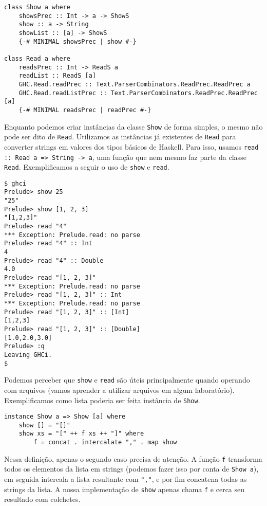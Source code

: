 \documentclass[a4paper]{article}
\begin{document}
\begin{verbatim}
class Show a where
	showsPrec :: Int -> a -> ShowS
	show :: a -> String
	showList :: [a] -> ShowS
	{-# MINIMAL showsPrec | show #-}

class Read a where
	readsPrec :: Int -> ReadS a
	readList :: ReadS [a]
	GHC.Read.readPrec :: Text.ParserCombinators.ReadPrec.ReadPrec a
	GHC.Read.readListPrec :: Text.ParserCombinators.ReadPrec.ReadPrec [a]
	{-# MINIMAL readsPrec | readPrec #-}
\end{verbatim}

Enquanto podemos criar instâncias da classe \texttt{Show} de forma simples, o mesmo não pode ser dito de \texttt{Read}.
Utilizamos as instâncias já existentes de \texttt{Read} para converter strings em valores dos tipos básicos de Haskell.
Para isso, usamos \texttt{read :: Read a => String -> a}, uma função que nem mesmo faz parte da classe \texttt{Read}.
Exemplificamos a seguir o uso de \texttt{show} e \texttt{read}.

\begin{verbatim}
$ ghci
Prelude> show 25
"25"
Prelude> show [1, 2, 3]
"[1,2,3]"
Prelude> read "4"
*** Exception: Prelude.read: no parse
Prelude> read "4" :: Int
4
Prelude> read "4" :: Double
4.0
Prelude> read "[1, 2, 3]"
*** Exception: Prelude.read: no parse
Prelude> read "[1, 2, 3]" :: Int
*** Exception: Prelude.read: no parse
Prelude> read "[1, 2, 3]" :: [Int]
[1,2,3]
Prelude> read "[1, 2, 3]" :: [Double]
[1.0,2.0,3.0]
Prelude> :q
Leaving GHCi.
$
\end{verbatim}

Podemos perceber que \texttt{show} e \texttt{read} são úteis principalmente quando operando com arquivos (vamos aprender a utilizar arquivos em algum laboratório).
Exemplificamos como lista poderia ser feita instância de \texttt{Show}.

\begin{verbatim}
instance Show a => Show [a] where
	show [] = "[]"
	show xs = "[" ++ f xs ++ "]" where
		f = concat . intercalate "," . map show
\end{verbatim}

Nessa definição, apenas o segundo caso precisa de atenção.
A função \texttt{f} transforma todos os elementos da lista em strings (podemos fazer isso por conta de \texttt{Show a}), em seguida intercala a lista resultante com \texttt{","}, e por fim concatena todas as strings da lista.
A nossa implementação de \texttt{show} apenas chama \texttt{f} e cerca seu resultado com colchetes.
\end{document}
